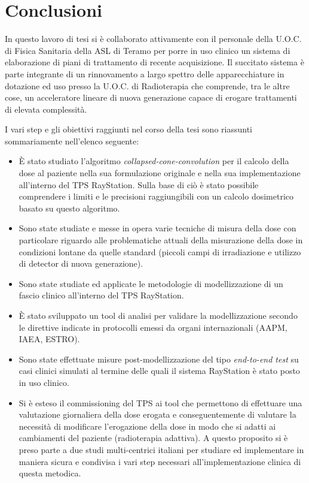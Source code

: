 \chapter*{Conclusioni}

In questo lavoro di tesi si è collaborato attivamente con il personale della U.O.C. di Fisica Sanitaria della ASL di Teramo per porre in uso clinico un sistema di elaborazione di piani di trattamento di recente acquisizione. Il succitato sistema è parte integrante di un rinnovamento a largo spettro delle apparecchiature in dotazione ed uso presso la U.O.C. di Radioterapia che comprende, tra le altre cose, un acceleratore lineare di nuova generazione capace di erogare trattamenti di elevata complessità.

I vari step e gli obiettivi raggiunti nel corso della tesi sono riassunti sommariamente nell'elenco seguente:

\begin{itemize}
\item \`E stato studiato l'algoritmo \textit{collapsed-cone-convolution} per il calcolo della dose al paziente nella sua formulazione originale e nella sua implementazione all'interno del TPS RayStation. Sulla base di ciò è stato possibile comprendere i limiti e le precisioni raggiungibili con un calcolo dosimetrico basato su questo algoritmo.

\item Sono state studiate e messe in opera varie tecniche di misura della dose con particolare riguardo alle problematiche attuali della misurazione della dose in condizioni lontane da quelle standard (piccoli campi di irradiazione e utilizzo di detector di nuova generazione).

\item Sono state studiate ed applicate le metodologie di modellizzazione di un fascio clinico all'interno del TPS RayStation.

\item \`E stato sviluppato un tool di analisi per validare la modellizzazione secondo le direttive indicate in protocolli emessi da organi internazionali (AAPM, IAEA, ESTRO).

\item Sono state effettuate misure post-modellizzazione del tipo \textit{end-to-end test} su casi clinici simulati al termine delle quali il sistema RayStation è stato posto in uso clinico.

\item Si è esteso il commissioning del TPS ai tool che permettono di effettuare una valutazione giornaliera della dose erogata e conseguentemente di valutare la necessità di modificare l'erogazione della dose in modo che si adatti ai cambiamenti del paziente (radioterapia adattiva). A questo proposito si è preso parte a due studi multi-centrici italiani per studiare ed implementare in maniera sicura e condivisa i vari step necessari all'implementazione clinica di questa metodica.

\end{itemize}





 